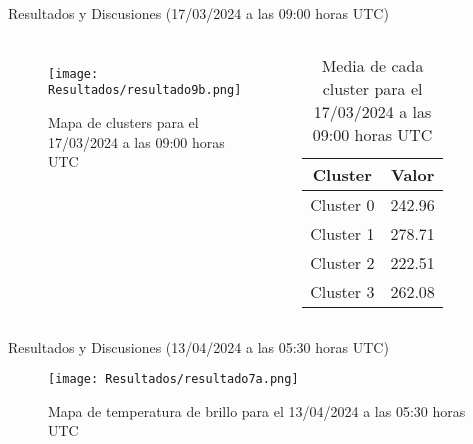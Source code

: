 \documentclass[aspectratio=169,xcolor=dvipsnames]{beamer}
\begin{document}
\begin{frame}{Resultados y Discusiones (17/03/2024 a las 09:00 horas UTC)}
    \begin{columns}

        \begin{figure}
            \centering
            \texttt{[image: Resultados/resultado9b.png]}
            {\footnotesize %
            \caption{Mapa de clusters para el 17/03/2024 a las 09:00 horas UTC}
            \label{fig21}
            }
        \end{figure}

        \centering
        \begin{table}[h!]
            \centering
            {\footnotesize %
            \begin{tabular}{|c|c|}
                \hline
                \textbf{Cluster} & \textbf{Valor} \\
                \hline
                Cluster 0 & 242.96 \\
                Cluster 1 & 278.71 \\
                Cluster 2 & 222.51 \\
                Cluster 3 & 262.08 \\                
                \hline
            \end{tabular}
            \caption{Media de cada cluster para el 17/03/2024 a las 09:00 horas UTC}
            }
        \end{table}

    \end{columns}
\end{frame}
\begin{frame}{Resultados y Discusiones (13/04/2024 a las 05:30 horas UTC)}
\begin{figure}
    \centering
    \texttt{[image: Resultados/resultado7a.png]}
    \caption{Mapa de temperatura de brillo para el 13/04/2024 a las 05:30 horas UTC}
    \label{fig22}
\end{figure}
\end{frame}
\end{document}
